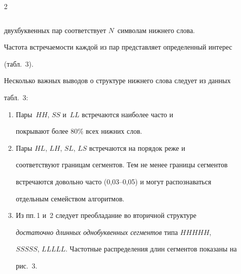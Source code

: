 \begin{multicols}{2}
{\begin{center}
\begin{tabular}{|c|c|}
\hline

\end{tabular}

\end{center}}

\vspace*{12pt}



\addtocounter{table}{1}



\noindent

двухбуквенных пар соответствует $N$~символам нижнего слова. 

Частота встречаемости каждой из пар представляет определенный интерес 

(табл.~3).





    Несколько важных выводов о структуре нижнего слова следует из данных 

табл.~3:

\begin{enumerate}[1.]

\item Пары~$HH$, $SS$ и~$LL$ встречаются наиболее часто и 

покрывают более 80\%  всех нижних слов. 

\item Пары $HL$, $LH$, $SL$, $LS$ встречаются на порядок реже  и 

соответствуют границам сегментов. Тем не менее границы сегментов 

встречаются довольно часто (0,03--0,05) и могут распознаваться 

отдельным семейством алгоритмов. 

\item Из пп.\,1 и~2 следует преобладание во вторичной структуре 

\textit{достаточно длинных однобуквенных сегментов} типа $HHHHH$, 

$SSSSS$, $LLLLL$. Частотные распределения длин сегментов показаны на 

рис.~3.

\end{enumerate}




\begin{center} %

\vspace*{12pt}


\end{center}
\end{multicols}
